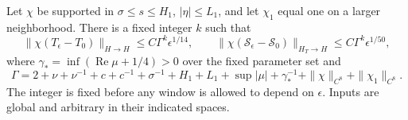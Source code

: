 \begin{proposition}\label{near:compact-free-comparison}
Let \(\chi\) be supported in \(\sigma\le s\le H_1\),
\(|\eta|\le L_1\), and let \(\chi_1\) equal one on a larger
neighborhood. There is a fixed integer \(k\) such that
\begin{equation}\label{near:compact-free-rates}
 \|\chi(T_\epsilon-T_0)\|_{H\to H}
       \le C\Gamma^k\epsilon^{1/14},\qquad
 \|\chi(\mathcal S_\epsilon-\mathcal S_0)\|_{H_T\to H}
       \le C\Gamma^k\epsilon^{1/50},
\end{equation}
where \(\gamma_*=\inf(\operatorname{Re}\mu+1/4)>0\) over the fixed
parameter set and
\[
 \Gamma=2+\nu+\nu^{-1}+c+c^{-1}+\sigma^{-1}+H_1+L_1
 +\sup|\mu|+\gamma_*^{-1}
 +\|\chi\|_{C^8}+\|\chi_1\|_{C^8}.
\]
The integer is fixed before any window is allowed to depend on
\(\epsilon\). Inputs are global and arbitrary in their indicated spaces.
\end{proposition}

